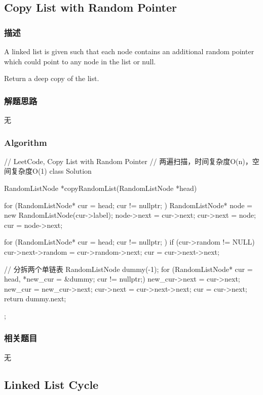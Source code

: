\subsection{Copy List with Random Pointer}
\label{sec:copy-list-with-random-pointer}


\subsubsection{描述}
A linked list is given such that each node contains an additional random 
pointer which could point to any node in the list or null.

Return a deep copy of the list.


\subsubsection{解题思路}
无


\subsubsection{Algorithm}
\begin{Code}
	// LeetCode, Copy List with Random Pointer
	// 两遍扫描，时间复杂度O(n)，空间复杂度O(1)
	class Solution {
		RandomListNode *copyRandomList(RandomListNode *head) {
			for (RandomListNode* cur = head; cur != nullptr; ) {
				RandomListNode* node = new RandomListNode(cur->label);
				node->next = cur->next;
				cur->next = node;
				cur = node->next;
			}
			
			for (RandomListNode* cur = head; cur != nullptr; ) {
				if (cur->random != NULL)
					cur->next->random = cur->random->next;
				cur = cur->next->next;
			}
			
			// 分拆两个单链表
			RandomListNode dummy(-1);
			for (RandomListNode* cur = head, *new_cur = &dummy; cur != nullptr;) {
				new_cur->next = cur->next;
				new_cur = new_cur->next;
				cur->next = cur->next->next;
				cur = cur->next;
			}
			return dummy.next;
		}
	};
\end{Code}


\subsubsection{相关题目}
\begindot
\item 无
\myenddot


\subsection{Linked List Cycle}
\label{sec:Linked-List-Cycle}


